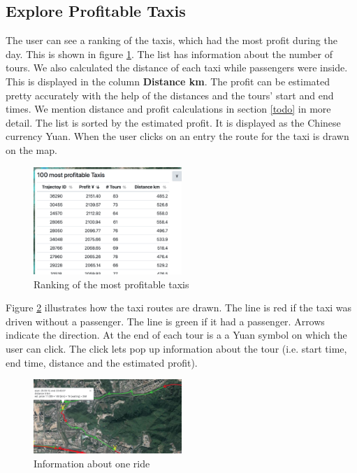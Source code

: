 \documentclass[10pt]{sig-alternate}
\begin{document}
\subsection{Explore Profitable Taxis}

The user can see a ranking of the taxis, which had the most profit during the day. This is shown in figure \ref{fig:ranking}. The list has information about the number of tours. We also calculated the distance of each taxi while passengers were inside. This is displayed in the column \textbf{Distance km}. The profit can be estimated pretty accurately with the help of the distances and the tours' start and end times. We mention distance and profit calculations in section \ref{todo} in more detail. The list is sorted by the estimated profit. It is displayed as the Chinese currency Yuan. When the user clicks on an entry the route for the taxi is drawn on the map.\\

\begin{figure}[ht]
\centering
\includegraphics[width=0.5\textwidth]{img/ranking.png}
\caption{Ranking of the most profitable taxis}
\label{fig:ranking}
\end{figure}

Figure \ref{fig:single_ride} illustrates how the taxi routes are drawn. The line is red if the taxi was driven without a passenger. The line is green if it had a passenger. Arrows indicate the direction. At the end of each tour is a a Yuan symbol on which the user can click. The click lets pop up information about the tour (i.e. start time, end time, distance and the estimated profit).\\

\begin{figure}[ht]
\centering
\includegraphics[width=0.5\textwidth]{img/single_ride.png}
\caption{Information about one ride}
\label{fig:single_ride}
\end{figure}
\end{document}
